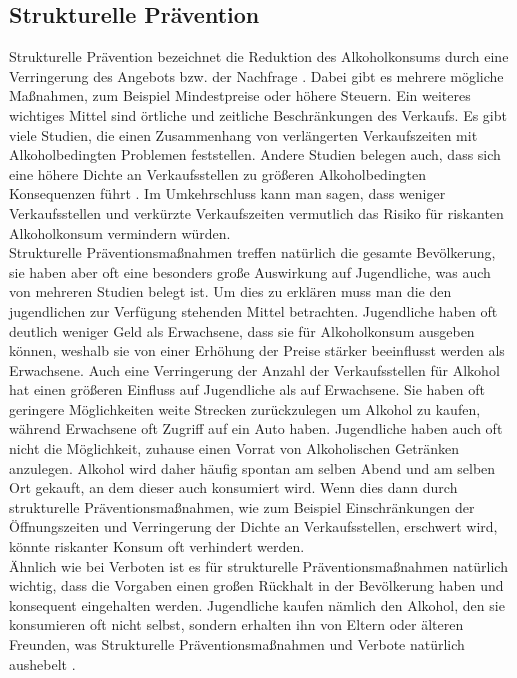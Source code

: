\documentclass[12pt]{article}
\begin{document}
\subsection{Strukturelle Prävention}
Strukturelle Prävention bezeichnet die Reduktion des Alkoholkonsums durch eine Verringerung des Angebots bzw. der Nachfrage \autocite[169]{skala_jugend_2020}. Dabei gibt es mehrere mögliche Maßnahmen, zum Beispiel Mindestpreise oder höhere Steuern. Ein weiteres wichtiges Mittel sind örtliche und zeitliche Beschränkungen des Verkaufs. Es gibt viele Studien, die einen Zusammenhang von verlängerten Verkaufszeiten mit Alkoholbedingten Problemen feststellen. Andere Studien belegen auch, dass sich eine höhere Dichte an Verkaufsstellen zu größeren Alkoholbedingten Konsequenzen führt \autocite[26]{hagen_verkaufseinschrankungen_2011}. Im Umkehrschluss kann man sagen, dass weniger Verkaufsstellen und verkürzte Verkaufszeiten vermutlich das Risiko für riskanten Alkoholkonsum vermindern würden.\\
Strukturelle Präventionsmaßnahmen treffen natürlich die gesamte Bevölkerung, sie haben aber oft eine besonders große Auswirkung auf Jugendliche, was auch von mehreren Studien belegt ist. Um dies zu erklären muss man die den jugendlichen zur Verfügung stehenden Mittel betrachten. Jugendliche haben oft deutlich weniger Geld als Erwachsene, dass sie für Alkoholkonsum ausgeben können, weshalb sie von einer Erhöhung der Preise stärker beeinflusst werden als Erwachsene. Auch eine Verringerung der Anzahl der Verkaufsstellen für Alkohol hat einen größeren Einfluss auf Jugendliche als auf Erwachsene. Sie haben oft geringere Möglichkeiten weite Strecken zurückzulegen um Alkohol zu kaufen, während Erwachsene oft Zugriff auf ein Auto haben. Jugendliche haben auch oft nicht die Möglichkeit, zuhause einen Vorrat von Alkoholischen Getränken anzulegen. Alkohol wird daher häufig spontan am selben Abend und am selben Ort gekauft, an dem dieser auch konsumiert wird. Wenn dies dann durch strukturelle Präventionsmaßnahmen, wie zum Beispiel Einschränkungen der Öffnungszeiten und Verringerung der Dichte an Verkaufsstellen, erschwert wird, könnte riskanter Konsum oft verhindert werden.\\
Ähnlich wie bei Verboten ist es für strukturelle Präventionsmaßnahmen natürlich wichtig, dass die Vorgaben einen großen Rückhalt in der Bevölkerung haben und konsequent eingehalten werden. Jugendliche kaufen nämlich den Alkohol, den sie konsumieren oft nicht selbst, sondern erhalten ihn von Eltern oder älteren Freunden, was Strukturelle Präventionsmaßnahmen und Verbote natürlich aushebelt \autocite[169]{skala_jugend_2020}.\\
\end{document}
